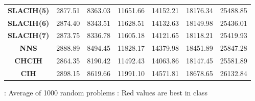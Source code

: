 \begin{landscape}
{\begin{table}[]
{\begin{tabular}{|c|cccccc|}
\rowcolor[HTML]{EFEFEF} 
\textbf{SLACIH(5)}                   & 2877.51                        & 8363.03                        & 11651.66                        & 14152.21                        & 18176.34                        & 25488.85                        \\
\textbf{SLACIH(6)}                   & 2874.40                        & 8343.51                        & 11628.51                        & 14132.63                        & 18149.98                        & 25436.01                        \\
\rowcolor[HTML]{EFEFEF} 
\textbf{SLACIH(7)}                   & 2873.75                        & 8336.78                        & 11605.18                        & 14121.65                        & 18118.21                        & 25419.93                        \\
\textbf{NNS}                         & 2888.89                        & 8494.45                        & 11828.17                        & 14379.98                        & 18451.89                        & 25847.28                        \\
\rowcolor[HTML]{EFEFEF} 
\textbf{CHCIH}                       & 2864.35                        & 8190.42                        & 11492.43                        & 14063.86                        & 18147.45                        & 25581.89                        \\
\textbf{CIH}                         & 2898.15                        & 8619.66                        & 11991.10                        & 14571.81                        & 18678.65                        & 26132.84                        \\ \hline
\end{tabular}%
}
  \begin{tablenotes}[flushleft]\small
  \source: Average of 1000 random problems
  \note:   Red values are best in class
  \end{tablenotes}
\end{table}

\pagebreak

}
\end{landscape}

